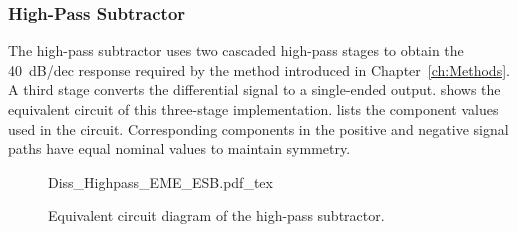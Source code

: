 \subsubsection*{High-Pass Subtractor}
The high-pass subtractor uses two cascaded high-pass stages to obtain the \SI{+40}{dB/dec} response required by the method introduced in Chapter~\ref{ch:Methods}.
A third stage converts the differential signal to a single-ended output.
 shows the equivalent circuit of this three-stage implementation.
 lists the component values used in the circuit.
Corresponding components in the positive and negative signal paths have equal nominal values to maintain symmetry.

\begin{figure}[ht]
	\centering
	{Diss_Highpass_EME_ESB.pdf_tex}
	\caption{Equivalent circuit diagram of the high-pass subtractor.}\label{fig:EME_ESB_HP}
\end{figure}

